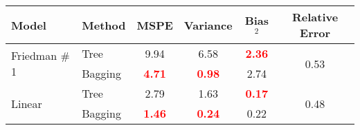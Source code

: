 
\begin{tabular}{ l l c c c c}
\toprule
\textbf{Model} & \textbf{Method} & \textbf{MSPE} &\textbf{Variance} & \textbf{Bias$^{2}$} & \textbf{Relative Error}\tabularnewline
\toprule
\multirow{2}{*}{Friedman \# 1}
& Tree & 9.94 & 6.58 & \textcolor{red}{\textbf{2.36}} & \multirow{2}{*}{0.53}\tabularnewline
& Bagging & \textcolor{red}{\textbf{4.71}} & \textcolor{red}{\textbf{0.98}} & 2.74 &\tabularnewline
\midrule
\multirow{2}{*}{Linear}
& Tree & 2.79 & 1.63 & \textcolor{red}{\textbf{0.17}} & \multirow{2}{*}{0.48}\tabularnewline
& Bagging & \textcolor{red}{\textbf{1.46}} & \textcolor{red}{\textbf{0.24}} & 0.22 &\tabularnewline
\bottomrule
\end{tabular}


